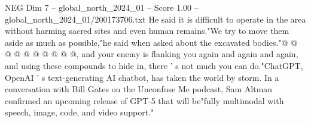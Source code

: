 \begin{textsample}{NEG Dim 7 – global\_north\_2024\_01 – Score 1.00 – global\_north\_2024\_01/200173706.txt}
He said it is difficult to operate in the area without harming sacred sites and even human remains."We try to move them aside as much as possible,"he said when asked about the excavated bodies."@ @ @ @ @ @ @ @ @ @, and your enemy is flanking you again and again and again, and using these compounds to hide in, there ' s not much you can do."ChatGPT, OpenAI ' s text-generating AI chatbot, has taken the world by storm.
In a conversation with Bill Gates on the Unconfuse Me podcast, Sam Altman confirmed an upcoming release of GPT-5 that will be"fully multimodal with speech, image, code, and video support."

\end{textsample}
